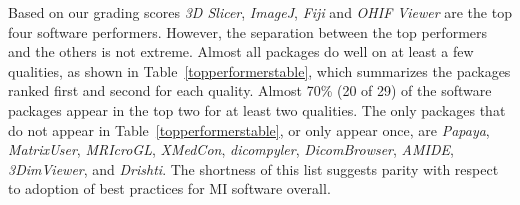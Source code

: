 \documentclass[final, 12pt, 3p, times]{elsarticle}
\begin{document}
Based on our grading scores \textit{3D Slicer}, \textit{ImageJ}, \textit{Fiji}
and \textit{OHIF Viewer} are the top four software performers.  However, the
separation between the top performers and the others is not extreme.  Almost all
packages do well on at least a few qualities, as shown in
Table~\ref{topperformerstable}, which summarizes the packages ranked first and
second for each quality. Almost 70\% (20 of 29) of the software packages appear
in the top two for at least two qualities.  The only packages that do not appear
in Table~\ref{topperformerstable}, or only appear once, are \textit{Papaya},
\textit{MatrixUser}, \textit{MRIcroGL}, \textit{XMedCon}, \textit{dicompyler},
\textit{DicomBrowser}, \textit{AMIDE}, \textit{3DimViewer}, and
\textit{Drishti}. The shortness of this list suggests parity with respect to
adoption of best practices for MI software overall.
\end{document}
